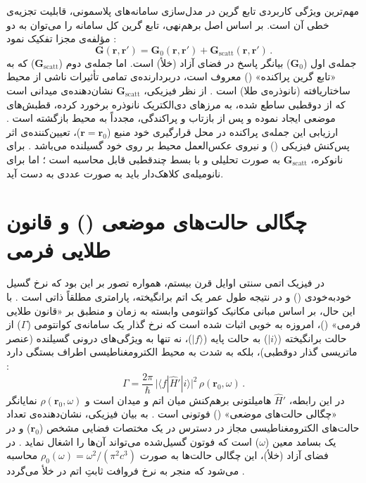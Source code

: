 \documentclass[12pt,a4paper]{report}
\newcommand{\sub}[1]{\mathrm{#1}}               %
\begin{document}
مهم‌ترین ویژگی کاربردی تابع گرین در مدل‌سازی سامانه‌های پلاسمونی، قابلیت تجزیه‌ی خطی آن است. بر اساس اصل برهم‌نهی، تابع گرین کل سامانه را می‌توان به دو مؤلفه‌ی مجزا تفکیک نمود \cite{novotny}:
\begin{equation}
\mathbf{G}(\mathbf{r},\mathbf{r}')=\mathbf{G}_0(\mathbf{r},\mathbf{r}')+\mathbf{G}_{\sub{scatt}}(\mathbf{r},\mathbf{r}')\,.
\end{equation}
جمله‌ی اول ($\mathbf{G}_0$) بیانگر پاسخ در فضای آزاد (خلأ) است. اما جمله‌ی دوم ($\mathbf{G}_{\sub{scatt}}$) که به «تابع گرین پراکنده» () معروف است، دربردارنده‌ی تمامی تأثیرات ناشی از محیط ساختاریافته (نانوذره‌ی طلا) است \cite{novotny}. از نظر فیزیکی، $\mathbf{G}_{\sub{scatt}}$ نشان‌دهنده‌ی میدانی است که از دوقطبی ساطع شده، به مرزهای دی‌الکتریک نانوذره برخورد کرده، قطبش‌های موضعی ایجاد نموده و پس از بازتاب و پراکندگی، مجدداً به محیط بازگشته است \cite{novotny}. ارزیابی این جمله‌ی پراکنده در محل قرارگیری خود منبع ($\mathbf{r}=\mathbf{r}_0$)، تعیین‌کننده‌ی اثر پس‌کنش فیزیکی () و نیروی عکس‌العمل محیط بر روی خود گسیلنده می‌باشد \cite{novotny}. برای نانوکره، $\mathbf{G}_{\sub{scatt}}$ به صورت تحلیلی و با بسط چندقطبی قابل محاسبه است \cite{ruppin,mertens}؛ اما برای نانومیله‌ی کلاهک‌دار باید به صورت عددی به دست آید.

\section{چگالی حالت‌های موضعی () و قانون طلایی فرمی}
در فیزیک اتمی سنتی اوایل قرن بیستم، همواره تصور بر این بود که نرخ گسیل خودبه‌خودی () و در نتیجه طول عمر یک اتم برانگیخته، پارامتری مطلقاً ذاتی است \cite{novotny}. با این حال، بر اساس مبانی مکانیک کوانتومی وابسته به زمان و منطبق بر «قانون طلایی فرمی» ()، امروزه به خوبی اثبات شده است که نرخ گذار یک سامانه‌ی کوانتومی ($\Gamma$) از حالت برانگیخته ($|i\rangle$) به حالت پایه ($|f\rangle$)، نه تنها به ویژگی‌های درونی گسیلنده (عنصر ماتریسی گذار دوقطبی)، بلکه به شدت به محیط الکترومغناطیسی اطراف بستگی دارد \cite{novotny}:
\begin{equation}
\Gamma=\frac{2\pi}{\hbar}\,\big|\langle f|\hat{H}'|i\rangle\big|^2\,\rho(\mathbf{r}_0,\omega)\,.
\end{equation}
در این رابطه، $\hat{H}'$ هامیلتونی برهم‌کنش میان اتم و میدان است و $\rho(\mathbf{r}_0,\omega)$ نمایانگر «چگالی حالت‌های موضعی» () فوتونی است \cite{novotny}. به بیان فیزیکی،  نشان‌دهنده‌ی تعداد حالت‌های الکترومغناطیسی مجاز در دسترس در یک مختصات فضایی مشخص ($\mathbf{r}_0$) و در یک بسامد معین ($\omega$) است که فوتون گسیل‌شده می‌تواند آن‌ها را اشغال نماید \cite{novotny,maier}. در فضای آزاد (خلأ)، این چگالی حالت‌ها به صورت $\rho_0(\omega)=\omega^2/(\pi^2c^3)$ محاسبه می‌شود که منجر به نرخ فروافت ثابتِ اتم در خلأ می‌گردد \cite{novotny}.
\end{document}
